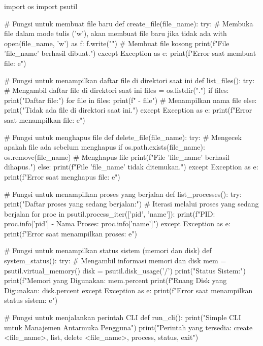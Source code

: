 \documentclass[12pt]{article}
\begin{document}
\begin{python}
import os
import psutil

# Fungsi untuk membuat file baru
def create_file(file_name):
    try:
        # Membuka file dalam mode tulis ('w'), akan membuat file baru jika tidak ada
        with open(file_name, 'w') as f:
            f.write("")  # Membuat file kosong
        print(f"File '{file_name}' berhasil dibuat.")
    except Exception as e:
        print(f"Error saat membuat file: {e}")

# Fungsi untuk menampilkan daftar file di direktori saat ini
def list_files():
    try:
        # Mengambil daftar file di direktori saat ini
        files = os.listdir(".")
        if files:
            print("Daftar file:")
            for file in files:
                print(f" - {file}")  # Menampilkan nama file
        else:
            print("Tidak ada file di direktori saat ini.")
    except Exception as e:
        print(f"Error saat menampilkan file: {e}")

# Fungsi untuk menghapus file
def delete_file(file_name):
    try:
        # Mengecek apakah file ada sebelum menghapus
        if os.path.exists(file_name):
            os.remove(file_name)  # Menghapus file
            print(f"File '{file_name}' berhasil dihapus.")
        else:
            print(f"File '{file_name}' tidak ditemukan.")
    except Exception as e:
        print(f"Error saat menghapus file: {e}")

# Fungsi untuk menampilkan proses yang berjalan
def list_processes():
    try:
        print("Daftar proses yang sedang berjalan:")
        # Iterasi melalui proses yang sedang berjalan
        for proc in psutil.process_iter(['pid', 'name']):
            print(f"PID: {proc.info['pid']} - Nama Proses: {proc.info['name']}")
    except Exception as e:
        print(f"Error saat menampilkan proses: {e}")

# Fungsi untuk menampilkan status sistem (memori dan disk)
def system_status():
    try:
        # Mengambil informasi memori dan disk
        mem = psutil.virtual_memory()
        disk = psutil.disk_usage('/')
        print("Status Sistem:")
        print(f"Memori yang Digunakan: {mem.percent}%
        print(f"Ruang Disk yang Digunakan: {disk.percent}%
    except Exception as e:
        print(f"Error saat menampilkan status sistem: {e}")

# Fungsi untuk menjalankan perintah CLI
def run_cli():
    print("Simple CLI untuk Manajemen Antarmuka Pengguna")
    print("Perintah yang tersedia: create <file_name>, list, delete <file_name>, process, status, exit")


\end{python}
\end{document}
